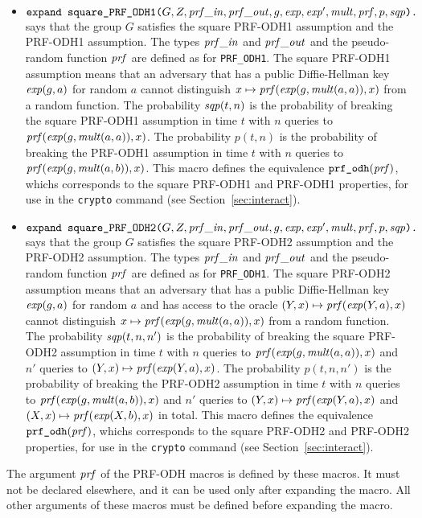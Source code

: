 \documentclass{article}
\begin{document}
\begin{itemize}
\begin{itemize}
\begin{itemize}
     \item $\texttt{expand\ square\_PRF\_ODH1(}G, Z, \mathit{prf\_in}, \mathit{prf\_out}, g, \mathit{exp}, \mathit{exp}', \mathit{mult}, \mathit{prf}, p, \mathit{sqp}\texttt{).}$ says that the group $G$ satisfies the square PRF-ODH1 assumption and the PRF-ODH1 assumption.
       The types $\mathit{prf\_in}$ and $\mathit{prf\_out}$ and the pseudo-random function $\mathit{prf}$ are defined as for \texttt{PRF\_ODH1}.
       The square PRF-ODH1 assumption means that an adversary that has a public Diffie-Hellman key $\mathit{exp}(g,a)$ for random $a$ cannot distinguish $x \mapsto \mathit{prf}(\mathit{exp}(g,\mathit{mult}(a,a)),x)$ from a random function.
       The probability $\mathit{sqp}(t, n)$ is the probability of
       breaking the square PRF-ODH1 assumption in time $t$ with $n$
       queries to $\mathit{prf}(\mathit{exp}(g,\mathit{mult}(a,a)),x)$.
   The probability $p(t, n)$ is the probability of breaking the PRF-ODH1 assumption
   in time $t$ with $n$ queries to $\mathit{prf}(\mathit{exp}(g,\mathit{mult}(a,b)),x)$.
   This macro defines the equivalence
       $\texttt{prf\_odh}(\mathit{prf})$, whichs corresponds to the square PRF-ODH1 and PRF-ODH1 properties, for use in the \texttt{crypto} command (see
       Section~\ref{sec:interact}).
     \item $\texttt{expand\ square\_PRF\_ODH2(}G, Z, \mathit{prf\_in}, \mathit{prf\_out}, g, \mathit{exp}, \mathit{exp}', \mathit{mult}, \mathit{prf}, p, \mathit{sqp}\texttt{).}$ says that the group $G$ satisfies the square PRF-ODH2 assumption and the PRF-ODH2 assumption.
       The types $\mathit{prf\_in}$ and $\mathit{prf\_out}$ and the pseudo-random function $\mathit{prf}$ are defined as for \texttt{PRF\_ODH1}.
       The square PRF-ODH2 assumption means that an adversary that has a public Diffie-Hellman key $\mathit{exp}(g,a)$ for random $a$ and has access to the oracle $(Y,x) \mapsto \mathit{prf}(\mathit{exp}(Y,a),x)$ cannot distinguish $x \mapsto \mathit{prf}(\mathit{exp}(g,\mathit{mult}(a,a)),x)$ from a random function.
The probability $\mathit{sqp}(t, n, n')$ is the probability of breaking the square PRF-ODH2 assumption
   in time $t$ with $n$ queries to $\mathit{prf}(\mathit{exp}(g,\mathit{mult}(a,a)),x)$ and $n'$ queries to $(Y,x) \mapsto \mathit{prf}(\mathit{exp}(Y,a),x)$.
       The probability $p(t, n, n')$ is the probability of breaking the PRF-ODH2 assumption
   in time $t$ with $n$ queries to $\mathit{prf}(\mathit{exp}(g,\mathit{mult}(a,b)),x)$ and $n'$ queries to $(Y,x) \mapsto \mathit{prf}(\mathit{exp}(Y,a),x)$ and $(X,x) \mapsto \mathit{prf}(\mathit{exp}(X,b),x)$ in total.
This macro defines the equivalence
       $\texttt{prf\_odh}(\mathit{prf})$, whichs corresponds to the square PRF-ODH2 and PRF-ODH2 properties, for use in the \texttt{crypto} command (see
Section~\ref{sec:interact}).
     \end{itemize}
     The argument $\mathit{prf}$ of the PRF-ODH macros is defined by these
     macros.  It must not be declared elsewhere, and it can be used
     only after expanding the macro.  All other arguments of these
     macros must be defined before expanding the macro.
     

\end{itemize}
\end{itemize}
\end{document}
